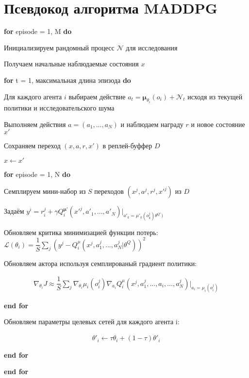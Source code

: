 \chapter{Псевдокод алгоритма MADDPG}\label{appendix-maddpg-alg} %

\setlength{\parindent}{0em}

\textbf{for} episode = 1, M \textbf{do}

\setlength{\parindent}{1em}

Инициализируем рандомный процесс $\mathcal{N}$ для исследования

Получаем начальные наблюдаемые состояния $x$

\textbf{for} t = 1, максимальная длина эпизода \textbf{do}

\setlength{\parindent}{2em}

Для каждого агента $i$ выбираем действие $a_t = \mathbf{\mu}_{\theta_i} (o_i) + \mathcal{N}_t$ исходя из текущей политики и исследовательского шума

Выполняем действия $a = (a_1, ..., a_N)$ и наблюдаем награду $r$ и новое состояние $x'$

Сохраняем переход $(x, a, r, x')$ в реплей-буффер $D$

$x \leftarrow x'$

\textbf{for} episode = 1, N \textbf{do}

\setlength{\parindent}{3em}

Семплируем мини-набор из $S$ переходов $(x^j, a^j, r^j, x'^j)$ из $D$

Задаём $y^i = r^j_i + \gamma Q^{\mathbf{\mu}'}_i (x'^j, a'_1, ..., a'_N)| _{a'_k = \mu'_k(o^j_k) \theta^{Q'})}$

Обновляем критика минимизацией функции потерь: $\mathcal{L}(\theta_i) = \dfrac{1}{S} \sum_{j} (y^j - Q^\mu_i(x^j, a^j_1, ..., a^j_N | \theta^Q))^2$

Обновляем актора используя семплированый градиент политики:

\begin{equation}
    \begin{multlined}
        \nabla_{\theta_i} J \approx \dfrac{1}{S} \sum_{j} \nabla_{\theta_i} \mu_i (o^j_i) \nabla_{a_i}Q^\mu_i(x^j, a^j_1, ..., a_i, ..., a^j_N) | _{a_i=\mu_i(o^j_i)}
    \end{multlined}
\end{equation}

\setlength{\parindent}{2em}

\textbf{end for}

Обновляем параметры целевых сетей для каждого агента i:

\begin{equation}
    \begin{multlined}
        \theta'_i \leftarrow \tau \theta_i + (1 - \tau) \theta'_i
    \end{multlined}
\end{equation}

\setlength{\parindent}{1em}

\textbf{end for}

\setlength{\parindent}{0em}

\textbf{end for}

\setlength{\parindent}{2.5em}
